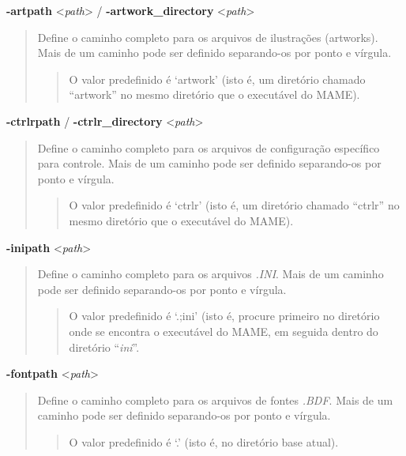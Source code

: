 \documentclass[letterpaper,10pt,brazil]{sphinxmanual}
\begin{document}
\label{commandline/commandline-all:mame-commandline-artpath}
\textbf{-artpath} \textless{}\emph{path}\textgreater{} / \textbf{-artwork\_directory} \textless{}\emph{path}\textgreater{}
\begin{quote}

Define o caminho completo para os arquivos de ilustrações
(artworks). Mais de um caminho pode ser definido separando-os por
ponto e vírgula.
\begin{quote}

O valor predefinido é `artwork' (isto é, um diretório chamado
``artwork'' no mesmo diretório que o executável do MAME).
\end{quote}
\end{quote}
\label{commandline/commandline-all:mame-commandline-ctrlrpath}
\textbf{-ctrlrpath} / \textbf{-ctrlr\_directory} \textless{}\emph{path}\textgreater{}
\begin{quote}

Define o caminho completo para os arquivos de configuração
específico para controle. Mais de um caminho pode ser definido
separando-os por ponto e vírgula.
\begin{quote}

O valor predefinido é `ctrlr' (isto é, um diretório chamado
``ctrlr'' no mesmo diretório que o executável do MAME).
\end{quote}
\end{quote}
\label{commandline/commandline-all:mame-commandline-inipath}
\textbf{-inipath} \textless{}\emph{path}\textgreater{}
\begin{quote}

Define o caminho completo para os arquivos \emph{.INI}. Mais de um
caminho pode ser definido separando-os por ponto e vírgula.
\begin{quote}

O valor predefinido é `.;ini' (isto é, procure primeiro no
diretório onde se encontra o executável do MAME, em seguida
dentro do diretório ``\emph{ini}''.
\end{quote}
\end{quote}
\label{commandline/commandline-all:mame-commandline-fontpath}
\textbf{-fontpath} \textless{}\emph{path}\textgreater{}
\begin{quote}

Define o caminho completo para os arquivos de fontes \emph{.BDF}.
Mais de um caminho pode ser definido separando-os por ponto e
vírgula.
\begin{quote}

O valor predefinido é `.' (isto é, no diretório base atual).
\end{quote}
\end{quote}
\end{document}
